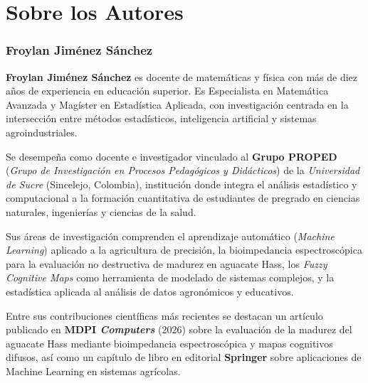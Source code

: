 
\chapter*{Sobre los Autores}

\bigskip

\subsection*{Froylan Jiménez Sánchez}

\noindent
\textbf{Froylan Jiménez Sánchez} es docente de matemáticas y física con más de diez años
de experiencia en educación superior. Es Especialista en Matemática Avanzada y Magíster en
Estadística Aplicada, con investigación centrada en la intersección entre métodos
estadísticos, inteligencia artificial y sistemas agroindustriales.

\medskip

Se desempeña como docente e investigador vinculado al \textbf{Grupo PROPED}
(\textit{Grupo de Investigación en Procesos Pedagógicos y Didácticos}) de la
\textit{Universidad de Sucre} (Sincelejo, Colombia), institución donde integra el
análisis estadístico y computacional a la formación cuantitativa de estudiantes de
pregrado en ciencias naturales, ingenierías y ciencias de la salud.

\medskip

Sus áreas de investigación comprenden el aprendizaje automático (\textit{Machine Learning})
aplicado a la agricultura de precisión, la bioimpedancia espectroscópica para la evaluación
no destructiva de madurez en aguacate Hass, los \textit{Fuzzy Cognitive Maps} como
herramienta de modelado de sistemas complejos, y la estadística aplicada al análisis de
datos agronómicos y educativos.

\medskip

Entre sus contribuciones científicas más recientes se destacan un artículo publicado en
\textbf{MDPI \textit{Computers}} (2026) sobre la evaluación de la madurez del aguacate
Hass mediante bioimpedancia espectroscópica y mapas cognitivos difusos, así como un
capítulo de libro en editorial \textbf{Springer} sobre aplicaciones de Machine Learning
en sistemas agrícolas.

